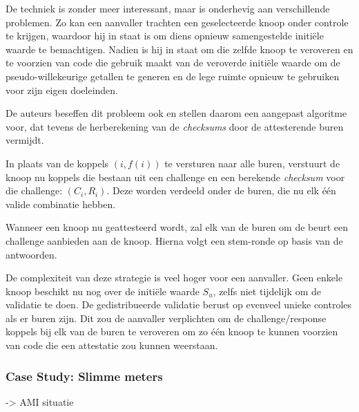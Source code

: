 De techniek is zonder meer interessant, maar is onderhevig aan verschillende
problemen. Zo kan een aanvaller trachten een geselecteerde knoop onder controle
te krijgen, waardoor hij in staat is om diens opnieuw samengestelde initi\"ele
waarde te bemachtigen. Nadien is hij in staat om die zelfde knoop te veroveren
en te voorzien van code die gebruik maakt van de veroverde initi\"ele waarde om
de pseudo-willekeurige getallen te generen en de lege ruimte opnieuw te
gebruiken voor zijn eigen doeleinden.

De auteurs beseffen dit probleem ook en stellen daarom een aangepast algoritme
voor, dat tevens de herberekening van de \emph{checksums} door de attesterende
buren vermijdt.

In plaats van de koppels $(i, f(i))$ te versturen naar alle buren, verstuurt de
knoop nu koppels die bestaan uit een challenge en een berekende \emph{checksum}
voor die challenge: $(C_i,R_i)$. Deze worden verdeeld onder de buren, die nu
elk \'e\'en valide combinatie hebben.

Wanneer een knoop nu geattesteerd wordt, zal elk van de buren om de beurt een
challenge aanbieden aan de knoop. Hierna volgt een stem-ronde op basis van de
antwoorden.

De complexiteit van deze strategie is veel hoger voor een aanvaller. Geen
enkele knoop beschikt nu nog over de initi\"ele waarde $S_u$, zelfs niet
tijdelijk om de validatie te doen. De gedistribueerde validatie berust op
evenveel unieke controles als er buren zijn. Dit zou de aanvaller verplichten
om de challenge/response koppels bij elk van de buren te veroveren om zo
\'e\'en knoop te kunnen voorzien van code die een attestatie zou kunnen
weerstaan.

\subsubsection*{Case Study: Slimme meters}

-> AMI situatie \cite{lemay2012cumulative}

\TODO
